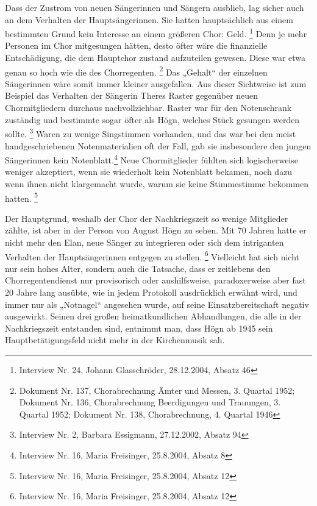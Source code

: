 Dass der Zustrom von neuen Sängerinnen und Sängern ausblieb, lag sicher
auch an dem Verhalten der Hauptsängerinnen. Sie hatten hauptsächlich
aus einem bestimmten Grund kein Interesse an einem größeren Chor:
Geld. \footnote{Interview Nr. 24, Johann Glasschröder, 28.12.2004,
Absatz 46} Denn je mehr Personen im Chor mitgesungen hätten, desto
öfter wäre die finanzielle Entschädigung, die dem Hauptchor zustand
aufzuteilen gewesen. Diese war etwa genau so hoch wie die des
Chorregenten. \footnote{Dokument Nr. 137, Chorabrechnung Ämter und
Messen, 3. Quartal 1952; Dokument Nr. 136, Chorabrechnung Beerdigungen
und Trauungen, 3. Quartal 1952; Dokument Nr. 138, Chorabrechnung, 4.
Quartal 1946} Das „Gehalt“ der einzelnen Sängerinnen wäre somit immer
kleiner ausgefallen. Aus dieser Sichtweise ist zum Beispiel das
Verhalten der Sängerin Theres Raster gegenüber neuen Chormitgliedern
durchaus nachvollziehbar. Raster war für den Notenschrank zuständig und
bestimmte sogar öfter als Högn, welches Stück gesungen werden
sollte. \footnote{Interview Nr. 2, Barbara Essigmann, 27.12.2002,
Absatz 94} Waren zu wenige Singstimmen vorhanden, und das war bei den
meist handgeschriebenen Notenmaterialien oft der Fall, gab sie
insbesondere den jungen Sängerinnen kein Notenblatt.\footnote{
Interview Nr. 16, Maria Freisinger, 25.8.2004, Absatz 8} Neue
Chormitglieder fühlten sich logischerweise weniger akzeptiert, wenn sie
wiederholt kein Notenblatt bekamen, noch dazu wenn ihnen nicht
klargemacht wurde, warum sie keine Stimmestimme bekommen
hatten. \footnote{Interview Nr. 16, Maria Freisinger, 25.8.2004, Absatz
12}

Der Hauptgrund, weshalb der Chor der Nachkriegszeit so wenige Mitglieder
zählte, ist aber in der Person von August Högn zu sehen. Mit 70 Jahren
hatte er nicht mehr den Elan, neue Sänger zu integrieren oder sich dem
intriganten Verhalten der Hauptsängerinnen entgegen zu
stellen. \footnote{Interview Nr. 16, Maria Freisinger, 25.8.2004,
Absatz 12} Vielleicht hat sich nicht nur sein hohes Alter, sondern auch
die Tatsache, dass er zeitlebens den Chorregentendienst nur
provisorisch oder aushilfsweise, paradoxerweise aber fast 20 Jahre lang
ausübte, wie in jedem Protokoll ausdrücklich erwähnt wird, und immer
nur als „Notnagel“ angesehen wurde, auf seine Einsatzbereitschaft
negativ ausgewirkt. Seinen drei großen heimatkundlichen Abhandlungen,
die alle in der Nachkriegszeit entstanden sind, entnimmt man, dass Högn
ab 1945 sein Hauptbetätigungsfeld nicht mehr in der Kirchenmusik sah.
